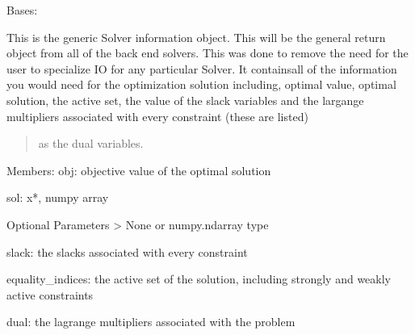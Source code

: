\documentclass[letterpaper,10pt,english]{sphinxmanual}
\begin{document}
\begin{fulllineitems}
\label{\detokenize{ppopt.solver_interface:ppopt.solver_interface.solver_interface_utils.SolverOutput}}
\sphinxAtStartPar
Bases: 

\sphinxAtStartPar
This is the generic Solver information object. This will be the general return object from all of the back end solvers. This was done to remove the need for the user to specialize IO for any particular Solver. It containsall of the information you would need for the optimization solution including, optimal value, optimal solution, the active set, the value of the slack variables and the largange multipliers associated with every constraint (these are listed)
\begin{quote}

\sphinxAtStartPar
as the dual variables.
\end{quote}

\sphinxAtStartPar
Members:
obj: objective value of the optimal solution

\sphinxAtStartPar
sol: x*, numpy array

\sphinxAtStartPar
Optional Parameters \sphinxhyphen{}\textgreater{} None or numpy.ndarray type

\sphinxAtStartPar
slack: the slacks associated with every constraint

\sphinxAtStartPar
equality\_indices: the active set of the solution, including strongly and weakly active constraints

\sphinxAtStartPar
dual: the lagrange multipliers associated with the problem

\begin{fulllineitems}
\label{\detokenize{ppopt.solver_interface:ppopt.solver_interface.solver_interface_utils.SolverOutput.active_set}}
\end{fulllineitems}


\end{fulllineitems}
\end{document}
